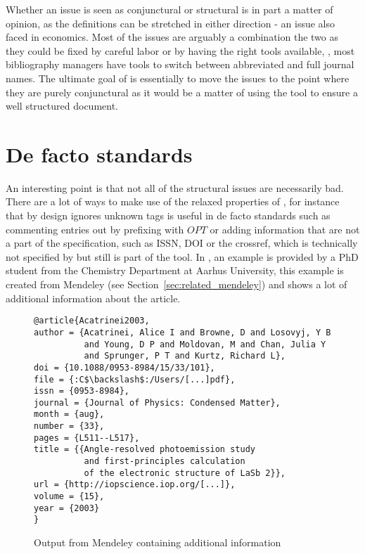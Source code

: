 Whether an issue is seen as conjunctural or structural is in part a
matter of opinion, as the definitions can be stretched in either
direction - an issue also faced in economics.  Most of the issues are
arguably a combination the two as they could be fixed by careful labor
or by having the right tools available, \eg, most bibliography
managers have tools to switch between abbreviated and full journal
names.  The ultimate goal of {\Orangutan} is essentially to move the
issues to the point where they are purely conjunctural as it would be
a matter of using the tool to ensure a well structured {\bibtex}
document.


\section{De facto standards}
\label{sec:problems_de_facto}

An interesting point is that not all of the structural issues are
necessarily bad.  There are a lot of ways to make use of the relaxed
properties of {\bibtex}, for instance that by design {\bibtex} ignores
unknown tags is useful in de facto standards such as commenting
entries out by prefixing with $OPT$ or adding information that are not
a part of the {\bibtex} specification, such as ISSN, DOI or the
crossref, which is technically not specified by {\bibtex} but still is
part of the tool.  In , an example is
provided by a PhD student from the Chemistry Department at Aarhus
University, this example is created from Mendeley (see
Section~\ref{sec:related_mendeley}) and shows a lot of additional
information about the article.

\begin{figure}
  \centering
\begin{small}
\begin{verbatim}
@article{Acatrinei2003,
author = {Acatrinei, Alice I and Browne, D and Losovyj, Y B
          and Young, D P and Moldovan, M and Chan, Julia Y
          and Sprunger, P T and Kurtz, Richard L},
doi = {10.1088/0953-8984/15/33/101},
file = {:C$\backslash$:/Users/[...]pdf},
issn = {0953-8984},
journal = {Journal of Physics: Condensed Matter},
month = {aug},
number = {33},
pages = {L511--L517},
title = {{Angle-resolved photoemission study
          and first-principles calculation
          of the electronic structure of LaSb 2}},
url = {http://iopscience.iop.org/[...]},
volume = {15},
year = {2003}
}
\end{verbatim}
\end{small}
  \caption{Output from Mendeley containing additional information}
\label{fig:mendeley_output}
\end{figure}


